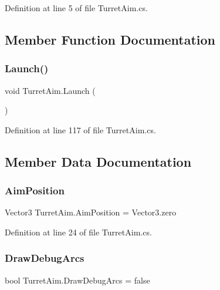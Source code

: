 Definition at line 5 of file Turret\+Aim.\+cs.



\subsection{Member Function Documentation}
\mbox{\label{class_turret_aim_a0676e7bfdf3631856418337b19e9224d}} 
\subsubsection{\texorpdfstring{Launch()}{Launch()}}
{\footnotesize\ttfamily void Turret\+Aim.\+Launch (\begin{DoxyParamCaption}{ }\end{DoxyParamCaption})}



Definition at line 117 of file Turret\+Aim.\+cs.



\subsection{Member Data Documentation}
\mbox{\label{class_turret_aim_a194f5413aa939b8cbb8a5a9edf2c8660}} 
\subsubsection{\texorpdfstring{Aim\+Position}{AimPosition}}
{\footnotesize\ttfamily Vector3 Turret\+Aim.\+Aim\+Position = Vector3.\+zero}



Definition at line 24 of file Turret\+Aim.\+cs.

\mbox{\label{class_turret_aim_a58ca0c5ce58f7a29b44263efc23cc14f}} 
\subsubsection{\texorpdfstring{Draw\+Debug\+Arcs}{DrawDebugArcs}}
{\footnotesize\ttfamily bool Turret\+Aim.\+Draw\+Debug\+Arcs = false}



